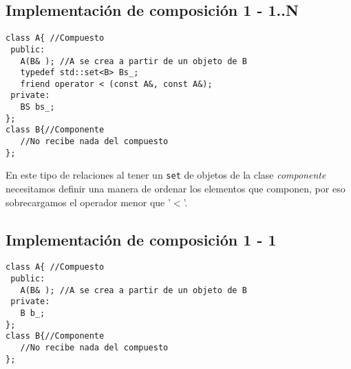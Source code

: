 \subsection{ Implementación de composición 1 - 1..N}
\begin{center}
	\begin{lstlisting}[frame=single]
class A{ //Compuesto
 public:
   A(B& ); //A se crea a partir de un objeto de B
   typedef std::set<B> Bs_;
   friend operator < (const A&, const A&);
 private:
   BS bs_;
};
class B{//Componente
   //No recibe nada del compuesto
};
\end{lstlisting}
\end{center}
En este tipo de relaciones al tener un \texttt{set} de objetos de la clase \textit{componente} necesitamos definir una manera de ordenar los elementos que componen, por eso sobrecargamos el operador menor que '$<$'.

\subsection{Implementación de composición 1 - 1}
\begin{center}
	\begin{lstlisting}[frame=single]
class A{ //Compuesto
 public:
   A(B& ); //A se crea a partir de un objeto de B
 private:
   B b_;
};
class B{//Componente
   //No recibe nada del compuesto
};
\end{lstlisting}
\end{center}